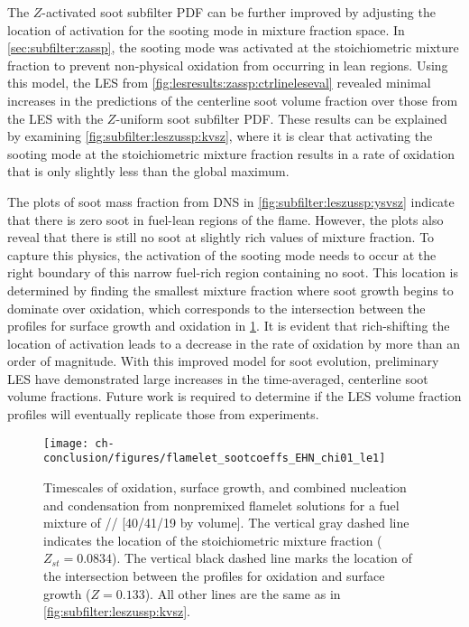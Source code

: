 The $Z$-activated soot subfilter PDF can be further improved by adjusting the location of activation for the sooting mode in mixture fraction space. In \cref{sec:subfilter:zassp}, the sooting mode was activated at the stoichiometric mixture fraction to prevent non-physical oxidation from occurring in lean regions. Using this model, the LES from \cref{fig:lesresults:zassp:ctrlineleseval} revealed minimal increases in the predictions of the centerline soot volume fraction over those from the LES with the $Z$-uniform soot subfilter PDF. These results can be explained by examining \cref{fig:subfilter:leszussp:kvsz}, where it is clear that activating the sooting mode at the stoichiometric mixture fraction results in a rate of oxidation that is only slightly less than the global maximum.

The plots of soot mass fraction from DNS in \cref{fig:subfilter:leszussp:ysvsz} indicate that there is zero soot in fuel-lean regions of the flame. However, the plots also reveal that there is still no soot at slightly rich values of mixture fraction. To capture this physics, the activation of the sooting mode needs to occur at the right boundary of this narrow fuel-rich region containing no soot. This location is determined by finding the smallest mixture fraction where soot growth begins to dominate over oxidation, which corresponds to the intersection between the profiles for surface growth and oxidation in \cref{fig:conclusion:future:zassp:shiftedz}. It is evident that rich-shifting the location of activation leads to a decrease in the rate of oxidation by more than an order of magnitude. With this improved model for soot evolution, preliminary LES have demonstrated large increases in the time-averaged, centerline soot volume fractions. Future work is required to determine if the LES volume fraction profiles will eventually replicate those from experiments.
\begin{figure}[htb]
  \centering
  \texttt{[image: ch-conclusion/figures/flamelet\_sootcoeffs\_EHN\_chi01\_le1]}
  \caption[Shifted Activation of ZASSP]{Timescales of oxidation, surface growth, and combined nucleation and condensation from nonpremixed flamelet solutions for a fuel mixture of // [40/41/19 by volume]. The vertical gray dashed line indicates the location of the stoichiometric mixture fraction ($Z_{st} = 0.0834$). The vertical black dashed line marks the location of the intersection between the profiles for oxidation and surface growth ($Z = 0.133$). All other lines are the same as in \cref{fig:subfilter:leszussp:kvsz}.}
  \label{fig:conclusion:future:zassp:shiftedz}
\end{figure}


